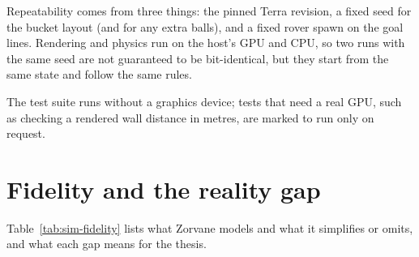 Repeatability comes from three things: the pinned Terra revision, a fixed seed for the bucket layout (and for any extra balls), and a fixed rover spawn on the goal lines.
Rendering and physics run on the host's GPU and CPU, so two runs with the same seed are not guaranteed to be bit-identical, but they start from the same state and follow the same rules.

The test suite runs without a graphics device; tests that need a real GPU, such as checking a rendered wall distance in metres, are marked to run only on request.

\section{Fidelity and the reality gap}
\label{sec:sim-fidelity}

Table~\ref{tab:sim-fidelity} lists what Zorvane models and what it simplifies or omits, and what each gap means for the thesis.

